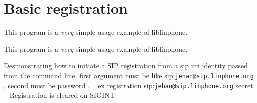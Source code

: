 \section{Basic registration}
\label{group__registration__tutorials}


This program is a {\itshape very} simple usage example of liblinphone.  


This program is a {\itshape very} simple usage example of liblinphone. 

Desmonstrating how to initiate a S\+IP registration from a sip uri identity passed from the command line. first argument must be like sip\+:{\tt jehan@sip.\+linphone.\+org} , second must be password . ~\newline
 ex registration sip\+:{\tt jehan@sip.\+linphone.\+org} secret ~\newline
Registration is cleared on S\+I\+G\+I\+NT ~\newline
 
